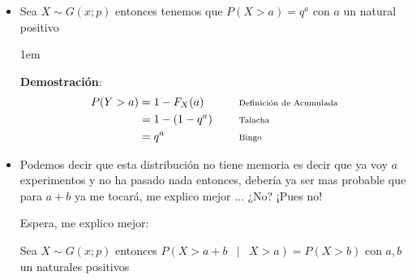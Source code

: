 \documentclass[12pt, fleqn]{report}                             %
\newenvironment{SmallIndentation}[1][0.75em]                    %
        {\begin{adjustwidth}{#1}{}\begin{footnotesize}}             %
        {\end{footnotesize}\end{adjustwidth}}                       %
\DeclareMathOperator \Space     {\quad}                         %
\DeclareMathOperator \MiniSpace {\;}                            %
\newcommand \Such           {\MiniSpace | \MiniSpace}           %
\newcommand \Remember[1]    {\Space\text{\scriptsize{#1}}}      %
\theoremstyle{break}                                            %
\begin{document}
                \begin{itemize}
                    
                    \item 
                        Sea $X \sim G(x; p)$ entonces tenemos que $P(X > a) = q^a$ con $a$ un natural positivo

                        \begin{SmallIndentation}[1em]
                            \textbf{Demostración}:
                            \begin{align*}
                                P(Y > a)
                                    &= 1 - F_X(a)      
                                        && \Remember{Definición de Acumulada}   \\
                                    &= 1 - (1 - q^a)    
                                        && \Remember{Talacha}                   \\
                                    &= q^a    
                                        && \Remember{Bingo}
                            \end{align*}    
                        
                        
                        \end{SmallIndentation}

                    \item 
                        Podemos decir que esta distribución no tiene memoria es decir que ya voy $a$ experimentos
                        y no ha pasado nada entonces, debería ya ser mas probable que para $a + b$ ya me tocará,
                        me explico mejor ... ¿No? ¡Pues no!

                        Espera, me explico mejor:

                        Sea $X \sim G(x; p)$ entonces $P(X > a + b \Such X > a) = P(X > b)$ 
                        con $a, b$ un naturales positivos


\end{itemize}
\end{document}
